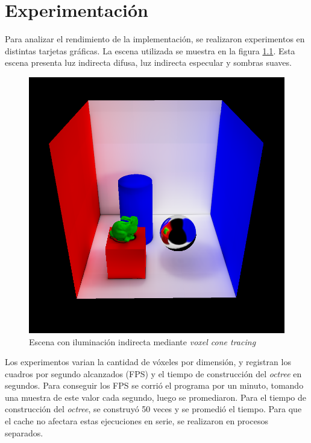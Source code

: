 \graphicspath{{chapters/5_experimentos/figures/}}

\chapter{Experimentación}\label{chap:experiments}

Para analizar el rendimiento de la implementación, se realizaron experimentos en distintas tarjetas gráficas.
La escena utilizada se muestra en la figura \ref{fig:cornell-box-full}.
Esta escena presenta luz indirecta difusa, luz indirecta especular y sombras suaves.

\begin{figure}
	\centering
	\includegraphics[width=\textwidth]{cornell-box-full.png}
	\caption{Escena con iluminación indirecta mediante \textit{voxel cone tracing}}
	\label{fig:cornell-box-full}
\end{figure}

Los experimentos varian la cantidad de vóxeles por dimensión, y registran los cuadros por segundo alcanzados (FPS) y el tiempo de construcción del \textit{octree} en segundos.
Para conseguir los FPS se corrió el programa por un minuto, tomando una muestra de este valor cada segundo, luego se promediaron.
Para el tiempo de construcción del \textit{octree}, se construyó 50 veces y se promedió el tiempo.
Para que el cache no afectara estas ejecuciones en serie, se realizaron en procesos separados.

